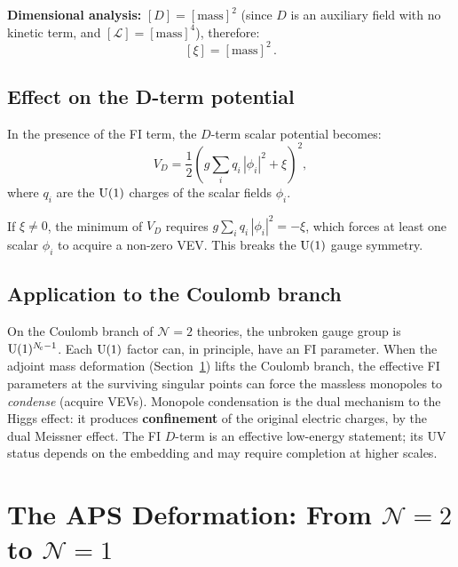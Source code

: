 \documentclass[11pt,a4paper]{article}
\begin{document}
\textbf{Dimensional analysis:} $[D] = [\mathrm{mass}]^2$ (since $D$ is
an auxiliary field with no kinetic term, and $[\mathcal{L}] =
[\mathrm{mass}]^4$), therefore:
\begin{equation}\label{eq:xi-dim}
  [\xi] = [\mathrm{mass}]^2\,.
\end{equation}

\subsection{Effect on the D-term potential}

In the presence of the FI term, the $D$-term scalar potential becomes:
\begin{equation}\label{eq:VD-FI}
  V_D = \frac{1}{2}\left(g\sum_i q_i\,|\phi_i|^2 + \xi\right)^{\!2},
\end{equation}
where $q_i$ are the $\mathrm{U}(1)$ charges of the scalar fields $\phi_i$.

If $\xi \neq 0$, the minimum of $V_D$ requires
$g\sum_i q_i\,|\phi_i|^2 = -\xi$, which forces at least one scalar
$\phi_i$ to acquire a non-zero VEV.  This breaks the $\mathrm{U}(1)$ gauge
symmetry.

\subsection{Application to the Coulomb branch}

On the Coulomb branch of $\mathcal{N}=2$ theories, the unbroken gauge
group is $\mathrm{U}(1)^{N_{\!c}-1}$.  Each $\mathrm{U}(1)$ factor can, in principle,
have an FI parameter.  When the adjoint mass deformation
(Section~\ref{sec:APS}) lifts the Coulomb branch, the effective FI
parameters at the surviving singular points can force the massless
monopoles to \emph{condense} (acquire VEVs).  Monopole condensation is
the dual mechanism to the Higgs effect: it produces
\textbf{confinement} of the original electric charges, by the dual
Meissner effect.
The FI $D$-term is an effective low-energy statement; its UV status depends on the embedding and may require completion at higher scales.


\section{The APS Deformation: From $\mathcal{N}=2$ to $\mathcal{N}=1$}
\label{sec:APS}
\end{document}
